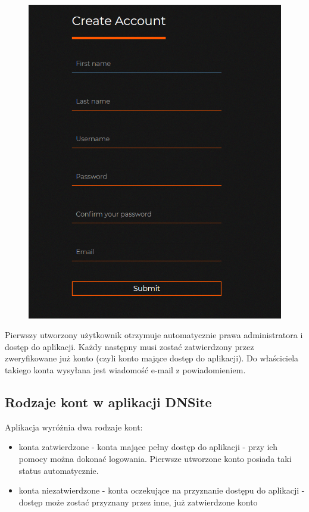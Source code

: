 \documentclass[12pt] {article}
\begin{document}
\begin{figure}[H]
\centering
\includegraphics[scale=0.5]{res/3_rejestracja}
\end{figure}
Pierwszy utworzony użytkownik otrzymuje automatycznie prawa administratora i dostęp do aplikacji. Każdy następny musi zostać zatwierdzony przez zweryfikowane już konto (czyli konto mające dostęp do aplikacji). Do właściciela takiego konta wysyłana jest wiadomość e-mail z powiadomieniem.

\subsection{Rodzaje kont w aplikacji DNSite}
Aplikacja wyróżnia dwa rodzaje kont:
\begin{itemize}
\item konta zatwierdzone - konta mające pełny dostęp do aplikacji - przy ich pomocy można dokonać logowania. Pierwsze utworzone konto posiada taki status automatycznie.
\item konta niezatwierdzone - konta oczekujące na przyznanie dostępu do aplikacji - dostęp może zostać przyznany przez inne, już zatwierdzone konto
\end{itemize}
\end{document}
